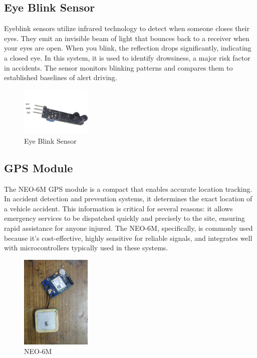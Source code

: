 \documentclass[12pt,a4paper]{report}
\begin{document}
	\subsection{Eye Blink Sensor}
	\begin{justify}
	
Eyeblink sensors utilize infrared technology to detect when someone closes their eyes. They emit an invisible beam of light that bounces back to a receiver when your eyes are open. When you blink, the reflection drops significantly, indicating a closed eye. In this system, it is used to identify drowsiness, a major risk factor in accidents. The sensor monitors blinking patterns and compares them to established baselines of alert driving.
	\end{justify}
	\begin{figure}[ht]
	    \centering
	    \includegraphics[width=0.3\textwidth]{viber_image_2024-02-29_07-41-30-340.jpg}
	    \caption{Eye Blink Sensor}
	    \label{fig:enter-label}
	\end{figure}
	\subsection{GPS Module}
 \begin{justify}
     The NEO-6M GPS module is a compact that enables accurate location tracking. In accident detection and prevention systems, it determines the exact location of a vehicle accident. This information is critical for several reasons: it allows emergency services to be dispatched quickly and precisely to the site, ensuring rapid assistance for anyone injured. The NEO-6M, specifically, is commonly used because it's cost-effective, highly sensitive for reliable signals, and integrates well with microcontrollers typically used in these systems.  
 \end{justify}
 \begin{figure}[ht]
     \centering
     \includegraphics[width=0.3\textwidth]{viber_image_2024-02-29_13-26-11-103.jpg}
     \caption{NEO-6M}
     \label{fig:enter-label}
 \end{figure}
\end{document}
